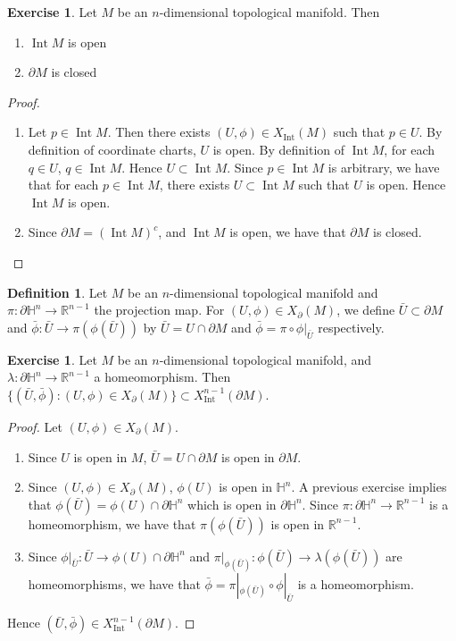 \documentclass{book}
\theoremstyle{definition}
\newtheorem{defn}[definition]{Definition}
\newtheorem{ex}[definition]{Exercise}
\newcommand{\lam}{\lambda}
\renewcommand{\H}{\mathbb{H}}
\newcommand{\R}{\mathbb{R}}
\DeclareMathOperator{\Int}{Int}
\DeclareMathOperator*{\0}{\mbf{0}}
\DeclareMathOperator*{\1}{\mbf{1}}
\newcommand{\p}{\partial}
\begin{document}
	\begin{ex}
		Let $M$ be an $n$-dimensional topological manifold. Then 
		\begin{enumerate}
			\item $\Int M$ is open
			\item $\p M$ is closed
		\end{enumerate}
	\end{ex}

	\begin{proof}\
		\begin{enumerate}
			\item Let $p \in \Int M$. Then there exists $(U, \phi) \in X_{\Int}(M)$ such that $p \in U$. By definition of coordinate charts, $U$ is open. By definition of $\Int M$, for each $q \in U$, $q \in \Int M$. Hence $U \subset \Int M$. Since $p \in \Int M$ is arbitrary, we have that for each $p \in \Int M$, there exists $U \subset \Int M$ such that $U$ is open. Hence $\Int M$ is open. 
			\item Since $\p M = (\Int M)^c$, and $\Int M$ is open, we have that $\p M$ is closed.
		\end{enumerate}
	\end{proof}

	\begin{defn}
		Let $M$ be an $n$-dimensional topological manifold and $\pi:\p \H^n \rightarrow \R^{n-1}$ the projection map. For $(U, \phi) \in X_{\p}(M)$, we define $\bar{U} \subset \p M$ and $\bar{\phi}: \bar{U} \rightarrow \pi (\phi(\bar{U}))$ by $\bar{U} = U \cap \p M$ and $\bar{\phi} = \pi \circ \phi|_{\bar{U}}$ respectively. 
	\end{defn}

	\begin{ex}
		Let $M$ be an $n$-dimensional topological manifold,  and $\lam: \p \H^n \rightarrow \R^{n-1}$ a homeomorphism. Then $\{(\bar{U}, \bar{\phi}): (U, \phi) \in X_{\p}(M)\} \subset X^{n-1}_{\Int}(\p M)$.
	\end{ex}

	\begin{proof}
		Let $(U, \phi) \in X_{\p}(M)$.
		\begin{enumerate}
			\item Since $U$ is open in $M$, $\bar{U} = U \cap \p M$ is open in $\p M$. 
			\item Since $(U, \phi) \in X_{\p}(M)$, $\phi(U)$ is open in $\H^n$. A previous exercise implies that $\phi(\bar{U}) = \phi(U) \cap \p \H^n$ which is open in $\p \H^n$. Since $\pi: \p \H^n \rightarrow \R^{n-1}$ is a homeomorphism, we have that $\pi(\phi(\bar{U}))$ is open in $\R^{n-1}$. 
			\item Since $\phi|_{\bar{U}}: \bar{U} \rightarrow \phi(U) \cap \p \H^n$ and $\pi|_{\phi(\bar{U})} : \phi(\bar{U}) \rightarrow \lam(\phi(\bar{U})) $ are homeomorphisms, we have that $\bar{\phi} = \pi|_{\phi(\bar{U})} \circ \phi|_{\bar{U}}$ is a homeomorphism.
		\end{enumerate}
		Hence $(\bar{U}, \bar{\phi}) \in  X^{n-1}_{\Int}(\p M)$.
	\end{proof}
\end{document}

